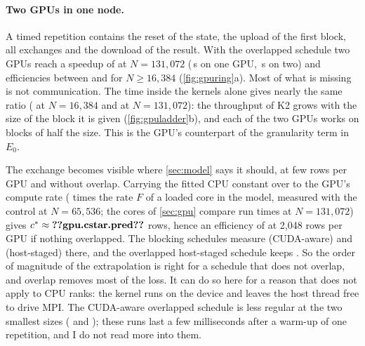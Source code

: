 \paragraph{Two GPUs in one node.} A timed repetition contains the reset of the
state, the upload of the first block, all exchanges and the download of the
result. With the overlapped schedule two GPUs reach a speedup of
 at $N=131{,}072$ (\,s on
one GPU, \,s on two) and efficiencies between
 and  for $N\ge16{,}384$
(\cref{fig:gpuring}a). Most of what is missing is not communication. The time
inside the kernels alone gives nearly the same ratio
( at $N=16{,}384$ and
 at $N=131{,}072$): the throughput of K2 grows
with the size of the block it is given (\cref{fig:gpuladder}b), and each of the two
GPUs works on blocks of half the size. This is the GPU's counterpart of the
granularity term in $E_0$.

The exchange becomes visible where \cref{sec:model} says it should, at few rows
per GPU and without overlap. Carrying the fitted CPU constant over to the GPU's
compute rate ( times the rate $F$ of a loaded core in the
model, measured with the control at $N=65{,}536$; the  cores of
\cref{sec:gpu} compare run times at $N=131{,}072$) gives
$c^*\approx\n{gpu.cstar.pred}$ rows, hence an efficiency of  at
2{,}048 rows per GPU if nothing overlapped. The blocking schedules measure
 (CUDA-aware) and
 (host-staged) there, and the overlapped
host-staged schedule keeps . So the order of
magnitude of the extrapolation is right for a schedule that does not overlap, and
overlap removes most of the loss. It can do so here for a reason that does not
apply to CPU ranks: the kernel runs on the device and leaves the host thread free
to drive MPI. The CUDA-aware overlapped schedule is less regular at the two
smallest sizes ( and
); these runs last a few milliseconds after a
warm-up of one repetition, and I do not read more into them.

